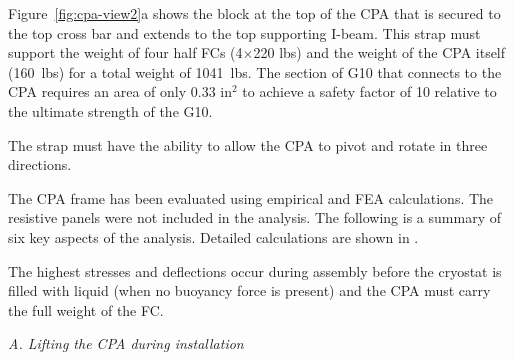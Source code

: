 Figure~\ref{fig:cpa-view2}a shows the block at the top of the CPA that is secured to the top cross bar and extends to the top supporting I-beam.  This strap must support the weight of four half FCs (4$\times$220 lbs) and the weight of the CPA itself (160~lbs) for a total weight of 1041~lbs. The section of G10 that connects to the CPA requires an area of only 0.33 in$^2$ to achieve a safety factor of 10 relative to the ultimate strength of the G10.  

The strap must have the ability to allow the CPA to pivot and rotate in three directions.  


The CPA frame has been evaluated using empirical and FEA calculations.  The resistive panels were not included in the analysis. The following is a summary of six key aspects of the analysis. Detailed calculations are shown in 
.  

The highest stresses and deflections occur during assembly before the cryostat is filled with liquid (when no buoyancy force is present) and the CPA must carry the full weight of the FC.




{\it A. Lifting the CPA during installation}


